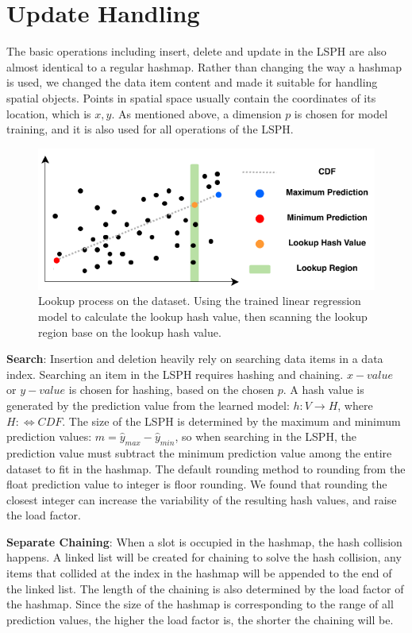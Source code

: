 \section{Update Handling}
The basic operations including insert, delete and update in the LSPH are also almost identical to a regular hashmap. Rather than changing the way a hashmap is used, we changed the data item content and made it suitable for handling spatial objects. Points in spatial space usually contain the coordinates of its location, which is ${x, y}$. As mentioned above, a dimension $p$ is chosen for model training, and it is also used for all operations of the LSPH. 


\begin{figure}[ht]
\centering
\includegraphics{Figures/search.pdf}
\caption{Lookup process on the dataset. Using the trained linear regression model to calculate the lookup hash value, then scanning the lookup region base on the lookup hash value.}
\label{fig:search}
\end{figure}


\textbf{Search}: Insertion and deletion heavily rely on searching data items in a data index. Searching an item in the LSPH requires hashing and chaining. $x-value$ or $y-value$ is chosen for hashing, based on the chosen $p$. A hash value is generated by the prediction value from the learned model: $h : V \rightarrow H$, where $H: \Leftrightarrow CDF$. The size of the LSPH is determined by the maximum and minimum prediction values: $m = \hat{y}_{max} - \hat{y}_{min}$, so when searching in the LSPH, the prediction value must subtract the minimum prediction value among the entire dataset to fit in the hashmap. The default rounding method to rounding from the float prediction value to integer is floor rounding. We found that rounding the closest integer can increase the variability of the resulting hash values, and raise the load factor. 


\textbf{Separate Chaining}: When a slot is occupied in the hashmap, the hash collision happens. A linked list will be created for chaining to solve the hash collision, any items that collided at the index in the hashmap will be appended to the end of the linked list. The length of the chaining is also determined by the load factor of the hashmap. Since the size of the hashmap is corresponding to the range of all prediction values, the higher the load factor is, the shorter the chaining will be. 

